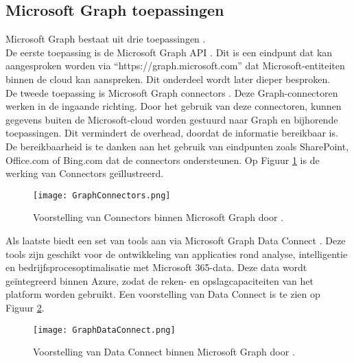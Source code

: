 \subsection{Microsoft Graph toepassingen}


Microsoft Graph bestaat uit drie toepassingen \autocite{Microsoft2023d}. \\

De eerste toepassing is de Microsoft Graph \Ac{API} \autocite{Microsoft2022e}. Dit is een eindpunt dat kan aangesproken worden via “https://graph.microsoft.com” dat Microsoft-entiteiten binnen de cloud kan aanspreken. Dit onderdeel wordt later dieper besproken. \\

De tweede toepassing is Microsoft Graph connectors \autocite{Microsoft2022f}. Deze Graph-connectoren werken in de ingaande richting. Door het gebruik van deze connectoren, kunnen gegevens buiten de Microsoft-cloud worden gestuurd naar Graph en bijhorende toepassingen. Dit vermindert de overhead, doordat de informatie bereikbaar is. De bereikbaarheid is te danken aan het gebruik van eindpunten zoals SharePoint, Office.com of Bing.com dat de connectors ondersteunen. Op Figuur \ref{MSGC} is de werking van Connectors geïllustreerd. \\

\begin{figure}[!h]
    \texttt{[image: GraphConnectors.png]}
    \caption[Voorbeeld Microsoft Graph Connectors]{Voorstelling van Connectors binnen Microsoft Graph door \textcite{Hay2021}.}
    \label{MSGC}
\end{figure}

Als laatste biedt \textcite{Microsoft2022c} een set van tools aan via Microsoft Graph Data Connect . Deze tools zijn geschikt voor de ontwikkeling van applicaties rond analyse, intelligentie en bedrijfsprocesoptimalisatie met Microsoft 365-data. Deze data wordt geïntegreerd binnen Azure, zodat de reken- en opslagcapaciteiten van het platform worden gebruikt. Een voorstelling van Data Connect is te zien op Figuur \ref{MSGDC}. 

\begin{figure}[!h]
    \texttt{[image: GraphDataConnect.png]}
    \caption[Voorbeeld Microsoft Graph Data Connect]{Voorstelling van Data Connect binnen Microsoft Graph door \textcite{Microsoft2022c}.}
    \label{MSGDC}
\end{figure}




